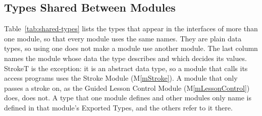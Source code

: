 \documentclass[12pt, titlepage]{article}
\newcommand{\mref}[1]{M\ref{#1}}
\begin{document}
\subsection{Types Shared Between Modules}
\label{sec:shared-types}

Table~\ref{tab:shared-types} lists the types that appear in the interfaces of
more than one module, so that every module uses the same names. They are plain
data types, so using one does not make a module use another module. The last
column names the module whose data the type describes and which decides its
values. StrokeT is the exception: it is an abstract data type, so a module that
calls its access programs uses the Stroke Module (\mref{mStroke}). A module
that only passes a stroke on, as the Guided Lesson Control Module
(\mref{mLessonControl}) does, does not. A type that one module defines and
other modules only name is defined in that module's Exported Types, and the
others refer to it there.
\end{document}
